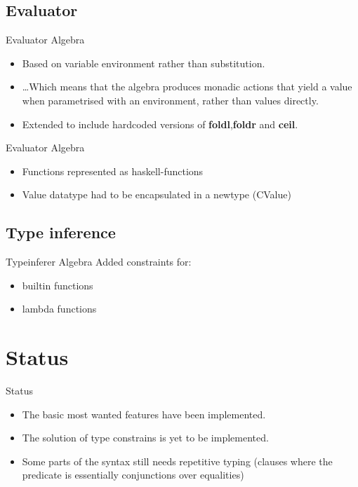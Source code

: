\documentclass{beamer}
\begin{document}
\subsection*{Evaluator}

\begin{frame}{Evaluator Algebra}
\begin{itemize}
\item Based on variable environment rather than substitution.
\item \dots Which means that the algebra produces monadic actions that yield a
value when parametrised with an environment, rather than values directly.
\item Extended to include hardcoded versions of \textbf{foldl},\textbf{foldr} and \textbf{ceil}.
\end{itemize}
\end{frame}

\begin{frame}{Evaluator Algebra}

\begin{itemize}
  \item Functions represented as haskell-functions
  \item Value datatype had to be encapsulated in a newtype (CValue)
\end{itemize}

\end{frame}

\subsection*{Type inference}

\begin{frame}{Typeinferer Algebra}
Added constraints for:
\begin{itemize}
  \item builtin functions
  \item lambda functions
\end{itemize}

\end{frame}

\section{Status}

\begin{frame}{Status}

\begin{itemize}
  \item The basic most wanted features have been implemented.
  \item The solution of type constrains is yet to be implemented.
  \item Some parts of the syntax still needs repetitive typing (clauses where
  the predicate is essentially conjunctions over equalities)
\end{itemize}

\end{frame}
\end{document}
